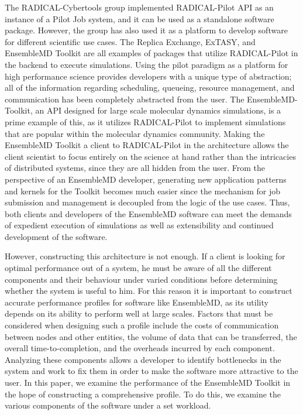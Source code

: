 \documentclass[]{article}
\begin{document}
	The RADICAL-Cybertools group implemented RADICAL-Pilot API as an instance of a Pilot Job system, and it can be used as a standalone software package. However, the group has also used it as a platform to develop software for different scientific use cases. The Replica Exchange, ExTASY, and EnsembleMD Toolkit are all examples of packages that utilize RADICAL-Pilot in the backend to execute simulations. Using the pilot paradigm as a platform for high performance science provides developers with a unique type of abstraction; all of the information regarding scheduling, queueing, resource management, and communication has been completely abstracted from the user. The EnsembleMD-Toolkit, an API designed for large scale molecular dynamics simulations, is a prime example of this, as it utilizes RADICAL-Pilot to implement simulations that are popular within the molecular dynamics community. Making the EnsembleMD Toolkit a client to RADICAL-Pilot in the architecture allows the client scientist to focus entirely on the science at hand rather than the intricacies of distributed systems, since they are all hidden from the user. From the perspective of an EnsembleMD developer, generating new application patterns and kernels for the Toolkit becomes much easier since the mechanism for job submission and management is decoupled from the logic of the use cases. Thus, both clients and developers of the EnsembleMD software can meet the demands of expedient execution of simulations as well as extensibility and continued development of the software.

	However, constructing this architecture is not enough. If a client is looking for optimal performance out of a system, he must be aware of all the different components and their behaviour under varied conditions before determining whether the system is useful to him. For this reason it is important to construct accurate performance profiles for software like EnsembleMD, as its utility depends on its ability to perform well at large scales. Factors that must be considered when designing such a profile include the costs of communication between nodes and other entities, the volume of data that can be transferred, the overall time-to-completion, and the overheads incurred by each component. Analyzing these components allows a developer to identify bottlenecks in the system and work to fix them in order to make the software more attractive to the user. In this paper, we examine the performance of the EnsembleMD Toolkit in the hope of constructing a comprehensive profile. To do this, we examine the various components of the software under a set workload.
\end{document}
